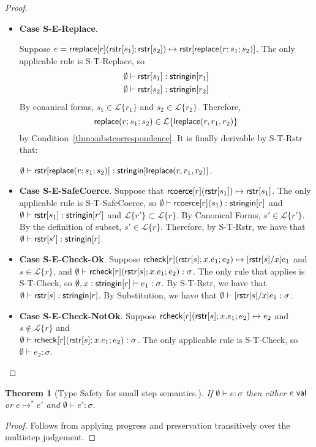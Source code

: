 \documentclass[11pt,leqno]{article}
\newtheorem{trthm}[tr]{Theorem}
\theoremstyle{definition}
\newcommand{\Lagr}{\mathcal{L}}
\newcommand{\lang}[1]{\Lagr\{#1\}}
\newcommand{\rcoerce}[2]{{\sf rcoerce}[#1](#2)}
\newcommand{\val}{{\sf val}}
\newcommand{\rcheck}[4]{ {\sf rcheck}[#1](#2;#3;#4) }
\newcommand{\stringin}[1]{{\sf stringin}[#1]}
\newcommand{\lsubst}[3]{{\sf replace}(#1;#2;#3)} %
\newcommand{\lreplace}[3]{{\sf lreplace}(#1; #2; #3)}
\renewcommand{\lreplace}[3]{{\sf lreplace}(#1, #2, #3)}
\begin{document}
\begin{proof}
\begin{itemize}[label=$ $,itemsep=1ex]
\item \textbf{Case S-E-Replace}.

Suppose $e = \rreplace{r}{\rstr{s_1}}{\rstr{s_2}} \mapsto \rstr{\lsubst{r}{s_1}{s_2}}$.
The only applicable rule is 
S-T-Replace, so
\begin{align*}
\emptyset &\vdash \rstr{s_1} : \stringin{r_1} \\
\emptyset &\vdash \rstr{s_2} : \stringin{r_2}
\end{align*}
By conanical forms,
$s_1 \in \lang{r_1}$ and $s_2 \in \lang{r_2}$.
Therefore, $$\lsubst{r}{s_1}{s_2} \in \lang{\lreplace{r}{r_1}{r_2}}$$ by Condition~\ref{thm:substcorrespondence}.
It is finally derivable by S-T-Rstr that:

$\emptyset \vdash \rstr{\lsubst{r}{s_1}{s_2}} : \stringin{\lreplace{r}{r_1}{r_2}}$.


\item \textbf{Case S-E-SafeCoerce}.
Suppose that $\rcoerce{r}{\rstr{s_1}} \mapsto \rstr{s_1}$.
The only applicable rule is S-T-SafeCoerce, so 
$\emptyset\vdash \rcoerce{r}{s_1} : \stringin{r}$ and $\emptyset \vdash \rstr{s_1} : \stringin{r'}$ and $\lang{r'} \subset \lang{r}$. 
By Canonical Forms, $s' \in \lang{r'}$. By the definition of subset, $s' \in \lang{r}$. Therefore, by S-T-Rstr, we have that $\emptyset\vdash \rstr{s'} : \stringin{r}$.

\item \textbf{Case S-E-Check-Ok}.
Suppose $\rcheck{r}{\rstr{s}}{x.e_1}{e_2} \mapsto \subst{\rstr{s}}{x}{e_1}$ and 
$s \in \lang{r}$, and $\emptyset \vdash \rcheck{r}{\rstr{s}}{x.e_1}{e_2} : \sigma$.
The only rule that applies is S-T-Check, so $\emptyset, x : \stringin{r} \vdash e_1 : \sigma$.
By S-T-Rstr, we have that $\emptyset \vdash \rstr{s} : \stringin{r}$. By Substitution, we have that $\emptyset \vdash [{\sf rstr}[s]/x]e_1 : \sigma$.

\item \textbf{Case S-E-Check-NotOk}.
Suppose $\rcheck{r}{\rstr{s}}{x.e_1}{e_2} \mapsto e_2$ and 
$s \not \in \lang{r}$ and \\$\emptyset \vdash \rcheck{r}{\rstr{s}}{x.e_1}{e_2} : \sigma$.
The only applicable rule is S-T-Check, so $\emptyset \vdash e_2 : \sigma$.

\end{itemize}
\end{proof}


\begin{trthm}[Type Safety for small step semantics.] \label{thm:sstypesafte}
If $\emptyset\vdash e : \sigma$ then either $e \ \val$ or $e \mapsto^* e'$ and $\emptyset\vdash e' : \sigma$.
\end{trthm}
\begin{proof}
Follows from applying progress and preservation transitively over the multistep judgement.
\end{proof}
\end{document}
